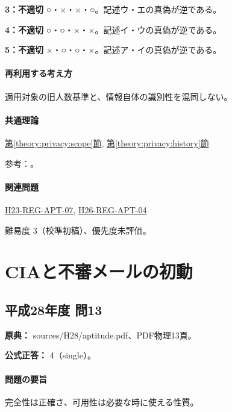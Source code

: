 \noindent\textbf{3：不適切} ○・×・×・○。記述ウ・エの真偽が逆である。\par

\noindent\textbf{4：不適切} ○・○・×・×。記述イ・ウの真偽が逆である。\par

\noindent\textbf{5：不適切} ×・○・○・×。記述ア・イの真偽が逆である。\par

\paragraph{再利用する考え方} 適用対象の旧人数基準と、情報自体の識別性を混同しない。

\paragraph{共通理論} \hyperref[theory:privacy:scope]{第\ref*{theory:privacy:scope}節}, \hyperref[theory:privacy:history]{第\ref*{theory:privacy:history}節}

\par 参考：\cite{privacy_general,privacy_small2017}。

\paragraph{関連問題} \hyperref[q:h23-reg-apt-07]{H23-REG-APT-07}, \hyperref[q:h26-reg-apt-04]{H26-REG-APT-04}

\par 難易度 3（校準初稿）、優先度未評価。

\section{CIAと不審メールの初動}

\subsection{平成28年度 問13}
\label{q:h28-reg-apt-13}

\noindent\textbf{原典：} sources/H28/aptitude.pdf、PDF物理13頁。

\textbf{公式正答：} 4（single）。

\paragraph{問題の要旨} 完全性は正確さ、可用性は必要な時に使える性質。

